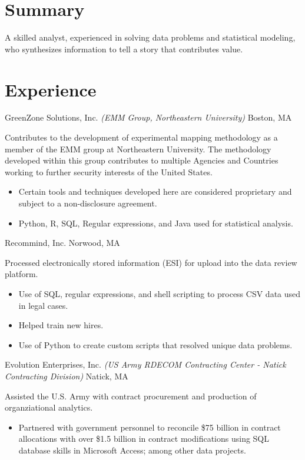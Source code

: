 \documentclass[10pt,a4paper]{moderncv}
\begin{document}
\makecvtitle
\section{Summary}
{A skilled analyst, experienced in solving data problems and statistical
  modeling, who synthesizes information to tell a story that contributes
  value.}
\section{Experience}
         {GreenZone Solutions, Inc.}
         {\textit{(EMM Group, Northeastern University)} Boston, MA}
         {}{Contributes to the development of experimental
           mapping methodology as a member of the EMM group at
           Northeastern University. The methodology developed within
           this group contributes to multiple Agencies and Countries
           working to further security interests of the United States.
           \newline
           \begin{itemize}
           \item Certain tools and techniques developed here are
             considered proprietary and subject to a non-disclosure
             agreement.
           \item Python, R, SQL, Regular expressions, and Java used for
             statistical analysis.
           \end{itemize}
         }

         {Recommind, Inc.}
         {Norwood, MA}
         {}{Processed electronically stored information (ESI) for
           upload into the data review platform.
           \newline
           \begin{itemize}
           \item Use of SQL, regular expressions, and shell scripting
             to process CSV data used in legal cases.
           \item Helped train new hires.
           \item Use of Python to create custom scripts that resolved
             unique data problems.
           \end{itemize}}

         {Evolution Enterprises, Inc.}
         {\textit{(US Army RDECOM Contracting Center - Natick Contracting Division)} Natick, MA}
         {}{Assisted the U.S. Army with contract procurement and
           production of organziational analytics.
           \newline
           \begin{itemize}
           \item Partnered with government personnel to reconcile
             \$75 billion in contract allocations with over \$1.5
             billion in contract modifications using SQL database
             skills in Microsoft Access; among other data projects.
         \end{itemize}}
\end{document}
